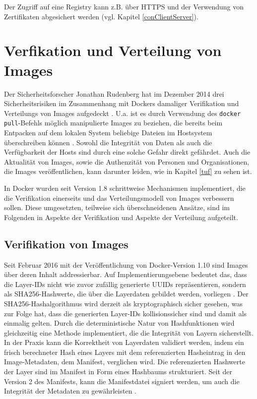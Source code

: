 \documentclass[../main.tex]{subfiles}
\begin{document}
    Der Zugriff auf eine Registry kann z.B. über \acrshort{HTTPS} und der Verwendung von Zertifikaten abgesichert werden \cite{dockerRegistry} (vgl. Kapitel \ref{conClientServer}).

  \section{Verfikation und Verteilung von Images}
    Der Sicherheitsforscher Jonathan Rudenberg hat im Dezember 2014 drei Sicherheitsrisiken im Zusammenhang mit Dockers damaliger Verifikation und Verteilungs von Images aufgedeckt \cite{githubRegistryV1Issues}\cite{registryV1IssuesRudenberg}. U.a. ist es durch Verwendung des \texttt{docker pull}-Befehls möglich manipulierte Images zu beziehen, die bereits beim Entpacken auf dem lokalen System beliebige Dateien im Hostsystem überschreiben können \cite{registryV1IssuesRedHat}. Sowohl die Integrität von Daten als auch die Verfügbarkeit der Hosts sind durch eine solche Gefahr direkt gefährdet. Auch die Aktualität von Images, sowie die Authenzität von Personen und Organisationen, die Images veröffentlichen, kann darunter leiden, wie in Kapitel \ref{tuf} zu sehen ist.

    In Docker wurden seit Version 1.8 schrittweise Mechanismen implementiert, die die Verifikation einerseits und das Verteilungsmodell von Images verbessern sollen. Diese umgesetzten, teilweise sich überschneidenen Ansätze, sind im Folgenden in Aspekte der Verifikation und Aspekte der Verteilung aufgeteilt.

    \subsection{Verifikation von Images}
      Seit Februar 2016 mit der Veröffentlichung von Docker-Version 1.10 sind Images über deren Inhalt addressierbar. Auf Implementierungsebene bedeutet das, dass die Layer-IDs nicht wie zuvor zufällig generierte UUIDs repräsentieren, sondern als SHA256-Hashwerte, die über die Layerdaten gebildet werden, vorliegen \cite[S.16]{slideshareImageDistribution}. Der SHA256-Hashalgorithmus wird derzeit als kryptographisch sicher gesehen, was zur Folge hat, dass die generierten Layer-IDs kollisionssicher sind und damit als einmalig gelten. Durch die deterministische Natur von Hashfunktionen wird gleichzeitig eine Methode implementiert, die die Integrität von Layern sicherstellt. In der Praxis kann die Korrektheit von Layerdaten validiert werden, indem ein frisch berechneter Hash eines Layers mit dem referenzierten Hasheintrag in den Image-Metadaten, dem Manifest, verglichen wird. Die referenzierten Hashwerte der Layer sind im Manifest in Form eines Hashbaums strukturiert. Seit der Version 2 des Manifests, kann die Manifestdatei signiert werden, um auch die Integrität der Metadaten zu gewährleisten \cite{githubImageManifest21}.
\end{document}
